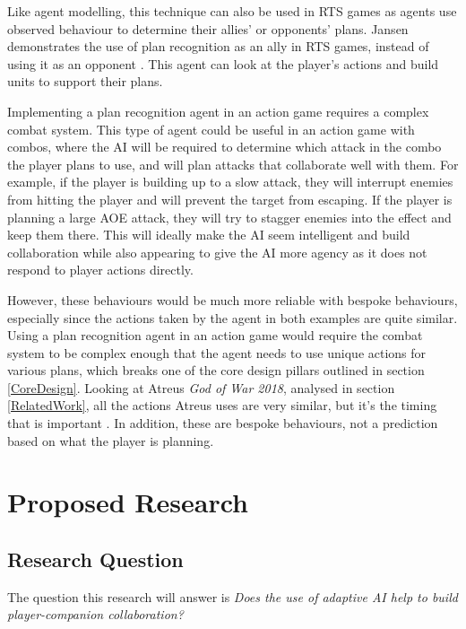 \documentclass{IEEEtran}
\begin{document}
Like agent modelling, this technique can also be used in RTS games as agents use observed behaviour to determine their allies' or opponents' plans. Jansen demonstrates the use of plan recognition as an ally in RTS games, instead of using it as an opponent \cite{PlayerAdaptiveRTSAI2007}. This agent can look at the player's actions and build units to support their plans.

Implementing a plan recognition agent in an action game requires a complex combat system. This type of agent could be useful in an action game with combos, where the AI will be required to determine which attack in the combo the player plans to use, and will plan attacks that collaborate well with them. For example, if the player is building up to a slow attack, they will interrupt enemies from hitting the player and will prevent the target from escaping. If the player is planning a large AOE attack, they will try to stagger enemies into the effect and keep them there. This will ideally make the AI seem intelligent and build collaboration while also appearing to give the AI more agency as it does not respond to player actions directly.

However, these behaviours would be much more reliable with bespoke behaviours, especially since the actions taken by the agent in both examples are quite similar. Using a plan recognition agent in an action game would require the combat system to be complex enough that the agent needs to use unique actions for various plans, which breaks one of the core design pillars outlined in section \ref{CoreDesign}. Looking at Atreus \textit{God of War 2018}, analysed in section \ref{RelatedWork}, all the actions Atreus uses are very similar, but it’s the timing that is important \cite{GDCAtreus}. In addition, these are bespoke behaviours, not a prediction based on what the player is planning.

\section{Proposed Research}
\label{ProposedResearch}

\subsection{Research Question}
\label{ResearchQuestion}


The question this research will answer is \textit{Does the use of adaptive AI help to build player-companion collaboration?}
\end{document}
